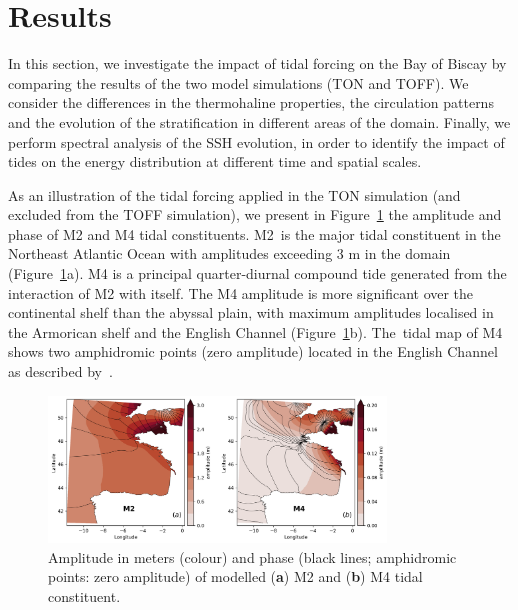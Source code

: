 \documentclass[jmse,article,accept,moreauthors,pdftex]{Definitions/mdpi}
\begin{document}
\section{Results}
\label{section:3}

In this section, we investigate the impact of tidal forcing on the Bay of Biscay by comparing the results of the two model simulations (TON and TOFF). We consider the differences in the thermohaline properties, the circulation patterns and the evolution of the stratification in different areas of the domain. Finally, we perform spectral analysis of the SSH evolution, in order to identify the impact of tides on the energy distribution at different time and spatial scales.

As an illustration of the tidal forcing applied in the TON simulation (and excluded from the TOFF simulation), we present in Figure~\ref{fig:tidal_constituents} the amplitude and phase of M2 and M4 tidal constituents. M2~is the major tidal constituent in the Northeast Atlantic Ocean with amplitudes exceeding 3 m in the domain (Figure~\ref{fig:tidal_constituents}a). M4 is a principal quarter-diurnal compound tide generated from the interaction of M2 with itself. The M4 amplitude is more significant over the continental shelf than the abyssal plain, with maximum amplitudes localised in the Armorican shelf and the English Channel (Figure~\ref{fig:tidal_constituents}b). The~tidal map of M4 shows two amphidromic points (zero amplitude) located in the English Channel as described by~\cite{LeProvost1985}.

\begin{figure}[H]
    \centering
    \includegraphics[width=0.8\textwidth]{Definitions/figure2.png}
    \caption{Amplitude in meters (colour) and phase (black lines; amphidromic points: zero amplitude) of modelled (\textbf{a}) M2 and (\textbf{b}) M4 tidal constituent.}
    \label{fig:tidal_constituents}
\end{figure}

\end{document}

